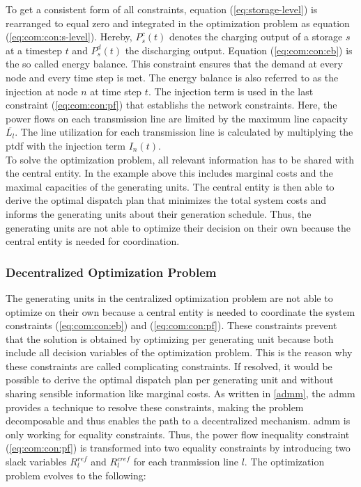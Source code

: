 To get a consistent form of all constraints, equation (\ref{eq:storage-level}) is rearranged to equal zero and integrated in the optimization problem as equation (\ref{eq:com:con:s-level}). Hereby, $P_s^c(t)$ denotes the charging output of a storage $s$ at a timestep $t$ and $P_s^d(t)$ the discharging output. Equation (\ref{eq:com:con:eb}) is the so called energy balance. This constraint ensures that the demand at every node and every time step is met. The energy balance is also referred to as the injection at node $n$ at time step $t$. The injection term is used in the last constraint (\ref{eq:com:con:pf}) that establishs the network constraints. Here, the power flows on each transmission line are limited by the maximum line capacity $\overline{L_l}$. The line utilization for each transmission line is calculated by multiplying the \gls{ptdf} with the injection term $I_n(t)$.\\

	
To solve the optimization problem, all relevant information has to be shared with the central entity. In the example above this includes marginal costs and the maximal capacities of the generating units. The central entity is then able to derive the optimal dispatch plan that minimizes the total system costs and informs the generating units about their generation schedule. Thus, the generating units are not able to optimize their decision on their own because the central entity is needed for coordination.	

\subsubsection{Decentralized Optimization Problem}
\label{sec:dom}

The generating units in the centralized optimization problem are not able to optimize on their own because a central entity is needed to coordinate the system constraints (\ref{eq:com:con:eb}) and (\ref{eq:com:con:pf}). These constraints prevent that the solution is obtained by optimizing per generating unit because both include all decision variables of the optimization problem. This is the reason why these constraints are called complicating constraints. If resolved, it would be possible to derive the optimal dispatch plan per generating unit and without sharing sensible information like marginal costs. As written in \ref{admm}, the \gls{admm} provides a technique to resolve these constraints, making the problem decomposable and thus enables the path to a decentralized mechanism. \gls{admm} is only working for equality constraints. Thus, the power flow inequality constraint (\ref{eq:com:con:pf}) is transformed into two equality constraints by introducing two slack variables $R^{ref}_l$ and $R^{cref}_l$ for each tranmission line $l$. The optimization problem evolves to the following:

